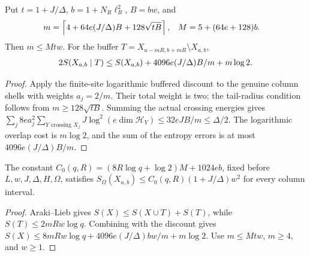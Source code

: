 \begin{lemma}
    \label{lem:strip_buffer_discount}
    \leanok
    Put $t=1+J/\Delta$, $b=1+N_R\ell_R^2$, $B=bw$, and
    \begin{align}
        m & =\left\lceil4+64e(J/\Delta)B+128\sqrt{tB}\right\rceil,
          & M                                                      & =5+(64e+128)b.\notag
    \end{align}
    Then $m\le Mtw$. For the buffer
    $T=X_{a-mR,b+mR}\setminus X_{a,b}$,
    \begin{align}
        2S(X_{a,b}\mid T)
        \le S(X_{a,b})+4096e(J/\Delta)B/m+m\log2.\notag
    \end{align}
\end{lemma}
\begin{proof}
    \leanok
    Apply the finite-site logarithmic buffered discount to the genuine
    column shells with weights $a_j=2/m$. Their total weight is two;
    the tail-radius condition follows from $m\ge128\sqrt{tB}$.
    Summing the actual crossing energies gives
    $\sum_j8e a_j^2\sum_{Y\text{ crossing }X_j}
        J\log^2(e\dim\mathcal H_Y)\le32eJB/m\le\Delta/2$.
    The logarithmic overlap cost is $m\log2$, and the sum of the
    entropy errors is at most $4096e(J/\Delta)B/m$.
\end{proof}

\begin{theorem}
    \label{thm:strip_area_law}
    \leanok
    The constant $C_0(q,R)=(8R\log q+\log2)M+1024eb$, fixed before
    $L,w,J,\Delta,H,\Omega$, satisfies
    $S_\Omega(X_{a,b})\le C_0(q,R)(1+J/\Delta)w^2$ for every column interval.
\end{theorem}
\begin{proof}
    \leanok
    Araki--Lieb gives $S(X)\le S(X\cup T)+S(T)$, while
    $S(T)\le2mRw\log q$. Combining with the discount gives
    $S(X)\le8mRw\log q+4096e(J/\Delta)bw/m+m\log2$.
    Use $m\le Mtw$, $m\ge4$, and $w\ge1$.
\end{proof}

